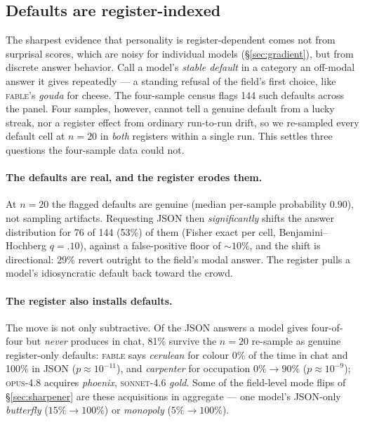 \documentclass[11pt]{article}
\begin{document}
\subsection{Defaults are register-indexed}
\label{sec:defaults}
The sharpest evidence that personality is register-dependent comes not from surprisal scores,
which are noisy for individual models (\S\ref{sec:gradient}), but from discrete answer behavior.
Call a model's \emph{stable default} in a category an off-modal answer it gives repeatedly --- a
standing refusal of the field's first choice, like \textsc{fable}'s \emph{gouda} for cheese. The
four-sample census flags 144 such defaults across the panel. Four samples, however, cannot tell a
genuine default from a lucky streak, nor a register effect from ordinary run-to-run drift, so we
re-sampled every default cell at $n=20$ in \emph{both} registers within a single run. This
settles three questions the four-sample data could not.

\paragraph{The defaults are real, and the register erodes them.} At $n=20$ the flagged defaults
are genuine (median per-sample probability $0.90$), not sampling artifacts. Requesting JSON then
\emph{significantly} shifts the answer distribution for 76 of 144 (53\%) of them (Fisher exact
per cell, Benjamini--Hochberg $q=.10$), against a false-positive floor of ${\sim}10\%$, and the
shift is directional: 29\% revert outright to the field's modal answer. The register pulls a
model's idiosyncratic default back toward the crowd.

\paragraph{The register also installs defaults.} The move is not only subtractive. Of the JSON
answers a model gives four-of-four but \emph{never} produces in chat, 81\% survive the $n=20$
re-sample as genuine register-only defaults: \textsc{fable} says \emph{cerulean} for colour 0\%
of the time in chat and 100\% in JSON ($p\approx10^{-11}$), and \emph{carpenter} for occupation
$0\%\to90\%$ ($p\approx10^{-9}$); \textsc{opus-4.8} acquires \emph{phoenix}, \textsc{sonnet-4.6}
\emph{gold}. Some of the field-level mode flips of \S\ref{sec:sharpener} are these acquisitions
in aggregate --- one model's JSON-only \emph{butterfly} ($15\%\to100\%$) or \emph{monopoly}
($5\%\to100\%$).
\end{document}
